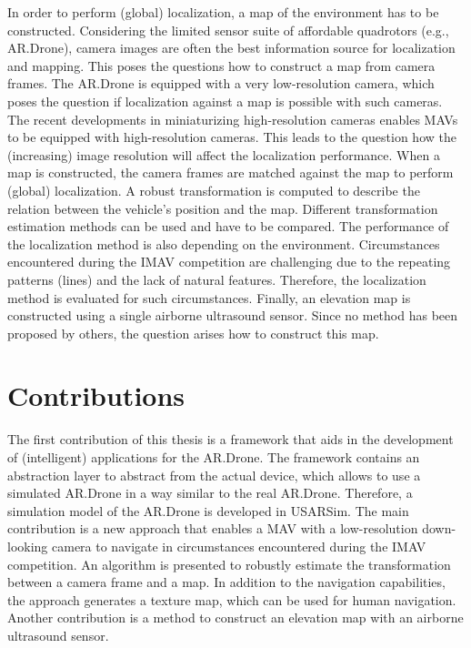 In order to perform (global) localization, a map of the environment has to be constructed.
Considering the limited sensor suite of affordable quadrotors (e.g., AR.Drone), camera images are often the best information source for localization and mapping.
This poses the questions how to construct a map from camera frames.
The AR.Drone is equipped with a very low-resolution camera, which poses the question if localization against a map is possible with such cameras.
The recent developments in miniaturizing high-resolution cameras enables MAVs to be equipped with high-resolution cameras.
This leads to the question how the (increasing) image resolution will affect the localization performance.
When a map is constructed, the camera frames are matched against the map to perform (global) localization.
A robust transformation is computed to describe the relation between the vehicle's position and the map.
Different transformation estimation methods can be used and have to be compared.
The performance of the localization method is also depending on the environment.
Circumstances encountered during the IMAV competition are challenging due to the repeating patterns (lines) and the lack of natural features.
Therefore, the localization method is evaluated for such circumstances.
Finally, an elevation map is constructed using a single airborne ultrasound sensor.
Since no method has been proposed by others, the question arises how to construct this map.





\section{Contributions}
The first contribution of this thesis is a framework that aids in the development of (intelligent) applications for the AR.Drone.
The framework contains an abstraction layer to abstract from the actual device, which allows to use a simulated AR.Drone in a way similar to the real AR.Drone.
Therefore, a simulation model of the AR.Drone is developed in USARSim.
The main contribution is a new approach that enables a MAV with a low-resolution down-looking camera to navigate in circumstances encountered during the IMAV competition.
An algorithm is presented to robustly estimate the transformation between a camera frame and a map.
In addition to the navigation capabilities, the approach generates a texture map, which can be used for human navigation.
Another contribution is a method to construct an elevation map with an airborne ultrasound sensor.

